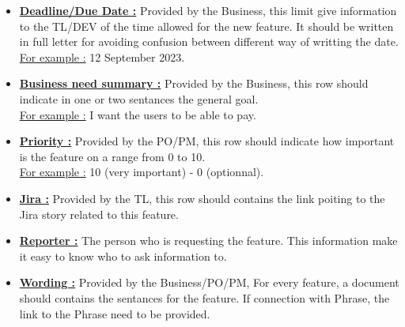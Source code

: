 \documentclass[a4paper,article,oneside]{memoir}
\begin{document}
        \begin{itemize}
  			\item {\color{BrickRed}\textbf{\underline{Deadline/Due Date :}}} Provided by the \gls{Business}, this limit give information to the \gls{TL}/\gls{DEV} of the time allowed for the new feature. It should be written in full letter for avoiding confusion between different way of writting the date. \\{\color{ForestGreen}\underline{For example :} 12 September 2023.}
  			 \item {\color{BrickRed}\textbf{\underline{Business need summary :}}} Provided by the \gls{Business}, this row should indicate in one or two sentances the general goal. \\{\color{ForestGreen}\underline{For example :} I want the users to be able to pay.}
  			 \item {\color{BrickRed}\textbf{\underline{Priority :}}} Provided by the \gls{PO}/\gls{PM}, this row should indicate how important is the feature on a range from 0 to 10. \\{\color{ForestGreen}\underline{For example :} 10 (very important) - 0 (optionnal).}
  			 \item {\color{BrickRed}\textbf{\underline{Jira :}}} Provided by the \gls{TL}, this row should contains the link poiting to the Jira story related to this feature.
  			   			 \item {\color{BrickRed}\textbf{\underline{Reporter :}}} The person who is requesting the feature. This information make it easy to know who to ask information to.
  		\item {\color{BrickRed}\textbf{\underline{Wording :}}} Provided by the \gls{Business}/\gls{PO}/\gls{PM}, For every feature, a document should contains the sentances for the feature. If connection with Phrase, the link to the Phrase need to be provided.
		\end{itemize}
\noindent{}

		
\end{document}
